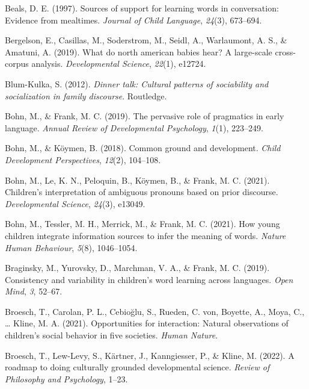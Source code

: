 \documentclass[
  man,floatsintext]{apa6}
\newlength{\cslhangindent}
\newlength{\cslentryspacingunit} %
\newenvironment{CSLReferences}[2] %
 {%
  \setlength{\parindent}{0pt}
  \ifodd #1
  \let\oldpar\par
  \def\par{\hangindent=\cslhangindent\oldpar}
  \fi
  \setlength{\parskip}{#2\cslentryspacingunit}
 }%
 {}
\begin{document}
\begin{CSLReferences}{1}{0}
\leavevmode{}%
Beals, D. E. (1997). Sources of support for learning words in conversation: Evidence from mealtimes. \emph{Journal of Child Language}, \emph{24}(3), 673--694.

\leavevmode{}%
Bergelson, E., Casillas, M., Soderstrom, M., Seidl, A., Warlaumont, A. S., \& Amatuni, A. (2019). What do north american babies hear? A large-scale cross-corpus analysis. \emph{Developmental Science}, \emph{22}(1), e12724.

\leavevmode{}%
Blum-Kulka, S. (2012). \emph{Dinner talk: Cultural patterns of sociability and socialization in family discourse}. Routledge.

\leavevmode{}%
Bohn, M., \& Frank, M. C. (2019). The pervasive role of pragmatics in early language. \emph{Annual Review of Developmental Psychology}, \emph{1}(1), 223--249.

\leavevmode{}%
Bohn, M., \& Köymen, B. (2018). Common ground and development. \emph{Child Development Perspectives}, \emph{12}(2), 104--108.

\leavevmode{}%
Bohn, M., Le, K. N., Peloquin, B., Köymen, B., \& Frank, M. C. (2021). Children's interpretation of ambiguous pronouns based on prior discourse. \emph{Developmental Science}, \emph{24}(3), e13049.

\leavevmode{}%
Bohn, M., Tessler, M. H., Merrick, M., \& Frank, M. C. (2021). How young children integrate information sources to infer the meaning of words. \emph{Nature Human Behaviour}, \emph{5}(8), 1046--1054.

\leavevmode{}%
Braginsky, M., Yurovsky, D., Marchman, V. A., \& Frank, M. C. (2019). Consistency and variability in children's word learning across languages. \emph{Open Mind}, \emph{3}, 52--67.

\leavevmode{}%
Broesch, T., Carolan, P. L., Cebioğlu, S., Rueden, C. von, Boyette, A., Moya, C., \ldots{} Kline, M. A. (2021). Opportunities for interaction: Natural observations of children's social behavior in five societies. \emph{Human Nature}.

\leavevmode{}%
Broesch, T., Lew-Levy, S., Kärtner, J., Kanngiesser, P., \& Kline, M. (2022). A roadmap to doing culturally grounded developmental science. \emph{Review of Philosophy and Psychology}, 1--23.


\end{CSLReferences}
\end{document}
